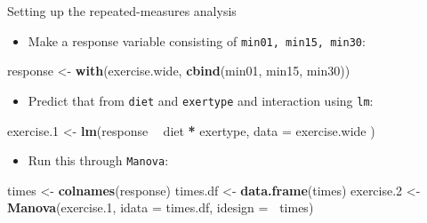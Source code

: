 \documentclass[ignorenonframetext,]{beamer}
\newenvironment{Shaded}{\begin{snugshade}}{\end{snugshade}}
\newcommand{\DataTypeTok}[1]{\textcolor[rgb]{0.13,0.29,0.53}{#1}}
\newcommand{\FloatTok}[1]{\textcolor[rgb]{0.00,0.00,0.81}{#1}}
\newcommand{\KeywordTok}[1]{\textcolor[rgb]{0.13,0.29,0.53}{\textbf{#1}}}
\newcommand{\NormalTok}[1]{#1}
\newcommand{\OperatorTok}[1]{\textcolor[rgb]{0.81,0.36,0.00}{\textbf{#1}}}
\newcommand{\StringTok}[1]{\textcolor[rgb]{0.31,0.60,0.02}{#1}}
\providecommand{\tightlist}{%
  \setlength{\itemsep}{0pt}\setlength{\parskip}{0pt}}
\begin{document}
\begin{frame}[fragile]{Setting up the repeated-measures analysis}
\protect\hypertarget{setting-up-the-repeated-measures-analysis}{}

\begin{itemize}
\tightlist
\item
  Make a response variable consisting of \texttt{min01,\ min15,\ min30}:
\end{itemize}

\small

\begin{Shaded}
\begin{Highlighting}[]
\NormalTok{response <-}\StringTok{ }\KeywordTok{with}\NormalTok{(exercise.wide, }\KeywordTok{cbind}\NormalTok{(min01, min15, min30))}
\end{Highlighting}
\end{Shaded}

\normalsize

\begin{itemize}
\tightlist
\item
  Predict that from \texttt{diet} and \texttt{exertype} and interaction
  using \texttt{lm}:
\end{itemize}

\small

\begin{Shaded}
\begin{Highlighting}[]
\NormalTok{exercise}\FloatTok{.1}\NormalTok{ <-}\StringTok{ }\KeywordTok{lm}\NormalTok{(response }\OperatorTok{~}\StringTok{ }\NormalTok{diet }\OperatorTok{*}\StringTok{ }\NormalTok{exertype,}
  \DataTypeTok{data =}\NormalTok{ exercise.wide}
\NormalTok{)}
\end{Highlighting}
\end{Shaded}

\normalsize

\begin{itemize}
\tightlist
\item
  Run this through \texttt{Manova}:
\end{itemize}

\small

\begin{Shaded}
\begin{Highlighting}[]
\NormalTok{times <-}\StringTok{ }\KeywordTok{colnames}\NormalTok{(response)}
\NormalTok{times.df <-}\StringTok{ }\KeywordTok{data.frame}\NormalTok{(times)}
\NormalTok{exercise}\FloatTok{.2}\NormalTok{ <-}\StringTok{ }\KeywordTok{Manova}\NormalTok{(exercise}\FloatTok{.1}\NormalTok{, }
                     \DataTypeTok{idata =}\NormalTok{ times.df, }
                     \DataTypeTok{idesign =} \OperatorTok{~}\NormalTok{times)}
\end{Highlighting}
\end{Shaded}

\normalsize

\end{frame}
\end{document}

